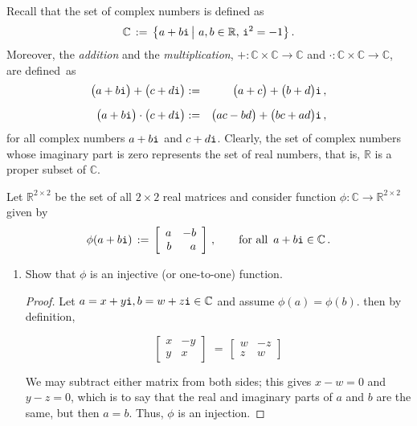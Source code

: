 \documentclass[11pt,table]{article}
\newcommand {\mat}  [1] {\left[\begin{array}{#1}}
\newcommand {\rix}      {\end{array}\right]}
\newcommand{\<}			{\langle}
\renewcommand{\>}      		{\rangle}
\newcommand{\bC}		{\mathbb{C}}
\newcommand{\bR}		{\mathbb{R}}
\newcommand {\basicbox} 		{\begin{tcolorbox}[width=\textwidth,colback={black!1}]}
\newcommand {\overbox}      {\end{tcolorbox}}
\begin{document}
\begin{enumerate}
\basicbox
Recall that the set of complex numbers is defined as 
\begin{equation} \label{eq:complex-num-set}
\mathbb{C} 
\, := \, 
\big\{ 
a + b {\tt i} \, \big| \,\, a, b \in \bR, \, {\tt i}^2 = -1 
\big\} 
\, .
\end{equation} 
Moreover, the {\em addition} and the {\em multiplication}, 
$+: \bC \times \bC \rightarrow \bC$ 
and
$\cdot : \bC \times \bC \rightarrow \bC$, 
are defined~as 
\begin{eqnarray} \label{eq:add-cmplx-num-def}
\big( a + b {\tt i} \big) 
+ 
\big( c + d {\tt i} \big) 
& := & 
\big(a + c \big) + \big(b + d \big) {\tt i} \, ,
\\[2mm]  \label{eq:mult-cmplx-num-def}
\big( a + b {\tt i} \big) 
\cdot
\big( c + d {\tt i} \big) 
& := & 
\big(ac - bd \big) + \big(bc + ad \big) {\tt i} \, ,
\end{eqnarray} 
for all complex numbers $a+b{\tt i}$ and $c + d {\tt i}$. 
Clearly, the set of complex numbers whose imaginary part is 
zero represents the set of real numbers, 
that is, $\bR$ is a proper subset of $\bC$. 
\overbox

\medskip

Let $\bR^{2 \times 2}$ be the set of all $2 \times 2$ 
real matrices and consider function 
$\phi: \bC \rightarrow \bR^{2 \times 2}$ 
given by 
\begin{equation} \label{eq:iso-cmplx-2x2}
\phi(a + b{\tt i}) 
\, := \, 
\mat{rr}
a & -b \\
b & a 
\rix \, , 
\qquad 
\textup{for all } \, a + b {\tt i} \in \bC \, .
\end{equation}
\begin{enumerate}[\rm (a)]
\item 
Show that $\phi$ is an injective (or one-to-one) function. 


\begin{proof}
	Let $a = x + y{\tt i},  b = w + z{\tt i} \in \bC$ and assume $\phi(a) = \phi(b)$. 
	then by definition, 
	
	\begin{equation}
		\mat{rr}
		x & -y \\
		y & x 
		\rix \, 
		\, = \, 
		\mat{rr}
		w & -z \\
		z & w
		\rix
	\end{equation}

	We may subtract either matrix from both sides; this 
	gives $x - w = 0$ and $y - z = 0$, which is to say that the real and imaginary parts of $a$ and $b$ are the same, but then $a = b$. 
	Thus, $\phi$ is an injection. 
\end{proof}


\end{enumerate}
\end{enumerate}
\end{document}
